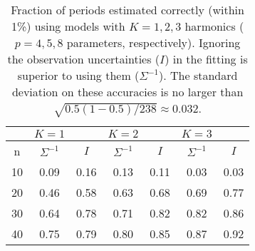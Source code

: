 \begin{table}[ht]
\centering
\begin{tabular}{c|cc|cc|cc}
 &   $K=1$ &    & $K=2$ &    & $K=3$ &  \\ 
  \hline
n & $\Sigma^{-1}$ &  $I$ & $\Sigma^{-1}$ &  $I$ & $\Sigma^{-1}$ &  $I$ \\
  \hline10&0.09&0.16&0.13&0.11&0.03&0.03\\20&0.46&0.58&0.63&0.68&0.69&0.77\\30&0.64&0.78&0.71&0.82&0.82&0.86\\40&0.75&0.79&0.80&0.85&0.87&0.92\\\hline
\end{tabular}
\caption{Fraction of periods estimated correctly (within 1\%) using models with $K=1,2,3$ harmonics ($p=4,5,8$ parameters, respectively). Ignoring the observation uncertainties ($I$) in the fitting is superior to using them ($\Sigma^{-1}$). The standard deviation on these accuracies is no larger than $\sqrt{0.5(1-0.5)/238} \approx 0.032$.}
\label{tab:period_est_results}
\end{table}
